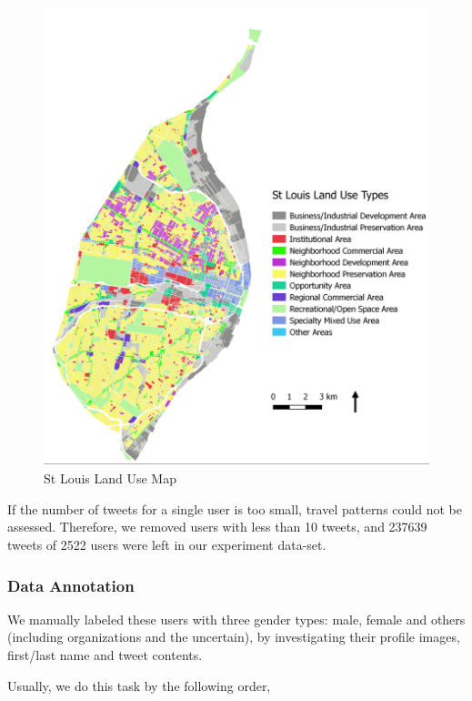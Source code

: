 \documentclass{article}
\begin{document}
\begin{figure}[ht]
\vskip 0.2in
\begin{center}
\centerline{\includegraphics[width=\columnwidth]{fig1.png}}
\caption{St Louis Land Use Map}
\label{fig1}
\end{center}
\vskip -0.2in
\end{figure} 

If the number of tweets for a single user is too small, travel patterns could not be assessed. Therefore, we removed users with less than 10 tweets, and 237639 tweets of 2522 users were left in our experiment data-set. 

\subsubsection{Data Annotation}

We manually labeled these users with three gender types: male, female and others (including organizations and the uncertain), by investigating their profile images, first/last name and tweet contents. 

Usually, we do this task by the following order,
\end{document}
